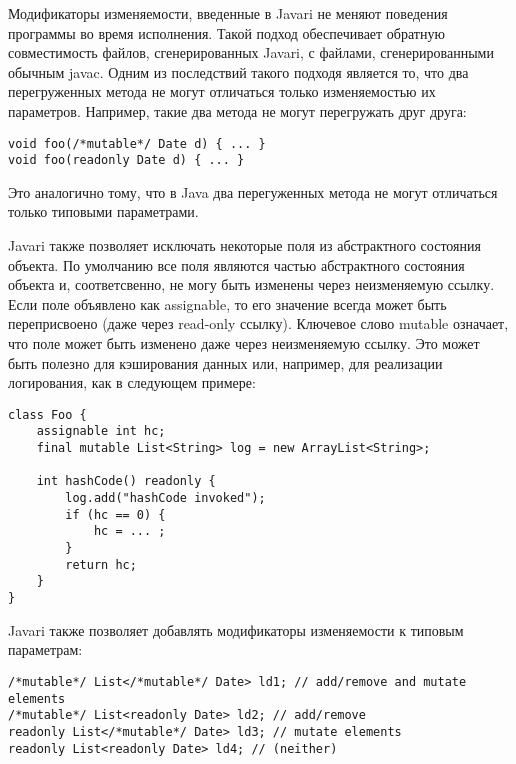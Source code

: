 Модификаторы изменяемости, введенные в Javari не меняют поведения программы во время исполнения. Такой подход обеспечивает обратную совместимость файлов, сгенерированных Javari, с файлами, сгенерированными обычным javac. Одним из последствий такого подходя является то, что два перегруженных метода не могут отличаться только изменяемостью их параметров. Например, такие два метода не могут перегружать друг друга:

\begin{lstlisting}[caption=Перегрузка методов, label=code:javari_method_overloading]
void foo(/*mutable*/ Date d) { ... } 
void foo(readonly Date d) { ... }
\end{lstlisting}

Это аналогично тому, что в Java два перегуженных метода не могут отличаться только типовыми параметрами.

Javari также позволяет исключать некоторые поля из абстрактного состояния объекта. По умолчанию все поля являются частью абстрактного состояния объекта и, соответсвенно, не могу быть изменены через неизменяемую ссылку. Если поле объявлено как assignable, то его значение всегда может быть переприсвоено (даже через read-only ссылку). Ключевое слово mutable означает, что поле может быть изменено даже через неизменяемую ссылку. Это может быть полезно для кэширования данных или, например, для реализации логирования, как в следующем примере:

\begin{lstlisting}[caption=assignable и mutable поля, label=code:assignable_mutable]
class Foo { 
    assignable int hc; 
    final mutable List<String> log = new ArrayList<String>;
    
    int hashCode() readonly { 
        log.add("hashCode invoked");
        if (hc == 0) { 
            hc = ... ;
        } 
        return hc; 
    } 
}
\end{lstlisting}

Javari также позволяет добавлять модификаторы изменяемости к типовым параметрам:

\begin{lstlisting}[caption=Модификаторы изменяемости в типовых параметрах, label=code:javari_generic_local]
/*mutable*/ List</*mutable*/ Date> ld1; // add/remove and mutate elements 
/*mutable*/ List<readonly Date> ld2; // add/remove 
readonly List</*mutable*/ Date> ld3; // mutate elements 
readonly List<readonly Date> ld4; // (neither)
\end{lstlisting} 

